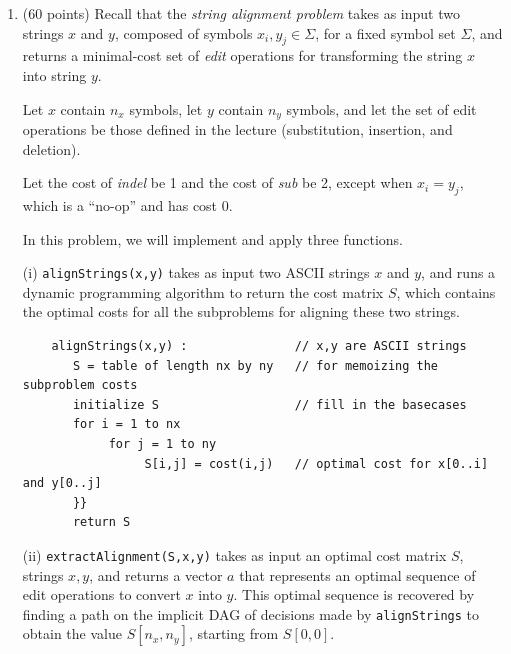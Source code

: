 \documentclass[12pt]{article}
\begin{document}
\renewcommand{\headrulewidth}{0.4pt}


\vspace{-3mm}
\begin{enumerate}
    
	\item (60 points) Recall that the \textit{string alignment problem} takes as input two strings $x$ and $y$, composed of symbols $x_{i},y_{j}\in \Sigma$, for a fixed symbol set $\Sigma$, and returns a minimal-cost set of \textit{edit} operations for transforming the string $x$ into string $y$.
	
	Let $x$ contain $n_{x}$ symbols, let $y$ contain $n_{y}$ symbols, and let the set of edit operations be those defined in the lecture (substitution, insertion, and deletion).
	
	Let the cost of \textit{indel} be 1 and the cost of \textit{sub} be 2, except when $x_{i}=y_{j}$, which is a ``no-op'' and has cost 0.
	
	In this problem, we will implement and apply three functions.
	
	(i) {\tt alignStrings(x,y)} takes as input two ASCII strings $x$ and $y$, and runs a dynamic programming algorithm to return the cost matrix $S$, which contains the optimal costs for all the subproblems for aligning these two strings. 
	
	\begin{small}
	\begin{verbatim}
	alignStrings(x,y) :               // x,y are ASCII strings
	   S = table of length nx by ny   // for memoizing the subproblem costs
	   initialize S                   // fill in the basecases
	   for i = 1 to nx
	        for j = 1 to ny
	             S[i,j] = cost(i,j)   // optimal cost for x[0..i] and y[0..j]
	   }}
	   return S
	\end{verbatim}
	\end{small}
	
	(ii) {\tt extractAlignment(S,x,y)} takes as input an optimal cost matrix $S$, strings $x,y$, and returns a vector $a$ that represents an optimal sequence of edit operations to convert $x$ into $y$. This optimal sequence is recovered by finding a path on the implicit DAG of decisions made by {\tt alignStrings} to obtain the value $S[n_{x},n_{y}]$, starting from $S[0,0]$. 
	

\end{enumerate}
\end{document}
